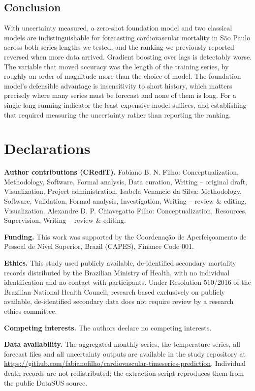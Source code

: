 \subsection{Conclusion}

With uncertainty measured, a zero-shot foundation model and two classical models are
indistinguishable for forecasting cardiovascular mortality in S\~ao Paulo across both series
lengths we tested, and the ranking we previously reported reversed when more data arrived.
Gradient boosting over lags is detectably worse. The variable that moved accuracy was the
length of the training series, by roughly an order of magnitude more than the choice of
model. The foundation model's defensible advantage is insensitivity to short history, which
matters precisely where many series must be forecast and none of them is long. For a single
long-running indicator the least expensive model suffices, and establishing that required
measuring the uncertainty rather than reporting the ranking.

\section*{Declarations}

\textbf{Author contributions (CRediT).} Fabiano B. N. Filho: Conceptualization,
Methodology, Software, Formal analysis, Data curation, Writing -- original draft,
Visualization, Project administration.
Isabela Venancio da Silva: Methodology, Software, Validation, Formal analysis,
Investigation, Writing -- review \& editing, Visualization.
Alexandre D. P. Chiavegatto Filho: Conceptualization, Resources, Supervision,
Writing -- review \& editing.

\textbf{Funding.} This work was supported by the Coordena\c{c}\~ao de Aperfei\c{c}oamento
de Pessoal de N\'ivel Superior, Brazil (CAPES), Finance Code 001.

\textbf{Ethics.} This study used publicly available, de-identified secondary mortality
records distributed by the Brazilian Ministry of Health, with no individual identification
and no contact with participants. Under Resolution 510/2016 of the Brazilian National
Health Council, research based exclusively on publicly available, de-identified secondary
data does not require review by a research ethics committee.

\textbf{Competing interests.} The authors declare no competing interests.

\textbf{Data availability.} The aggregated monthly series, the temperature series, all
forecast files and all uncertainty outputs are available in the study repository at
\url{https://github.com/fabianofilho/cardiovascular-timeseries-prediction}. Individual death
records are not redistributed; the extraction script reproduces them from the public DataSUS
source.


